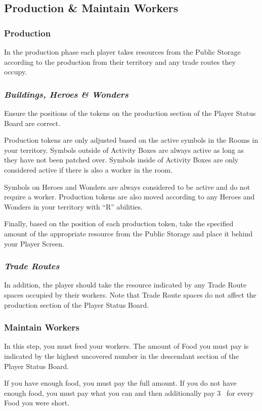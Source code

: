 \documentclass[10pt,twocolumn]{article}
\begin{document}
\subsection{Production \& Maintain Workers}
\subsubsection{Production}
In the production phase each player takes resources from the Public Storage according to the production from their territory and any trade routes they occupy.

\subsubsection*{\textit{Buildings, Heroes \& Wonders}}
Ensure the positions of the tokens on the production section of the Player Status Board are correct.

Production tokens are only adjusted based on the active symbols in the Rooms in your territory. Symbols outside of Activity Boxes are always active as long as they have not been patched over. Symbols inside of Activity Boxes are only considered active if there is also a worker in the room.

Symbols on Heroes and Wonders are always considered to be active and do not require a worker. Production tokens are also moved according to any Heroes and Wonders in your territory with ``R'' abilities.

Finally, based on the position of each production token, take the specified amount of the appropriate resource from the Public Storage and place it behind your Player Screen.

\subsubsection*{\textit{Trade Routes}}
In addition, the player should take the resource indicated by any Trade Route spaces occupied by their workers. Note that Trade Route spaces do not affect the production section of the Player Status Board.

\subsubsection{Maintain Workers}
In this step, you must feed your workers. The amount of Food you must pay is indicated by the highest uncovered number in the descendant section of the Player Status Board.

If you have enough food, you must pay the full amount. If you do not have enough food, you must pay what you can and then additionally pay 3 \vps\ for every Food you were short.
\end{document}
